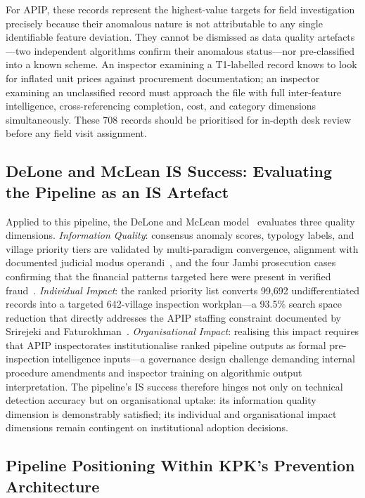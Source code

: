 \documentclass[3p,times,procedia]{elsarticle}
\begin{document}
For APIP, these records represent the highest-value targets for field investigation precisely because their anomalous nature is not attributable to any single identifiable feature deviation. They cannot be dismissed as data quality artefacts---two independent algorithms confirm their anomalous status---nor pre-classified into a known scheme. An inspector examining a T1-labelled record knows to look for inflated unit prices against procurement documentation; an inspector examining an unclassified record must approach the file with full inter-feature intelligence, cross-referencing completion, cost, and category dimensions simultaneously. These 708 records should be prioritised for in-depth desk review before any field visit assignment.

\subsection{DeLone and McLean IS Success: Evaluating the Pipeline as an IS Artefact}

Applied to this pipeline, the DeLone and McLean model~\cite{ref31} evaluates three quality dimensions. \textit{Information Quality}: consensus anomaly scores, typology labels, and village priority tiers are validated by multi-paradigm convergence, alignment with documented judicial modus operandi~\cite{ref13,ref14}, and the four Jambi prosecution cases confirming that the financial patterns targeted here were present in verified fraud~\cite{ref15,ref16,ref17,ref18}. \textit{Individual Impact}: the ranked priority list converts 99,692 undifferentiated records into a targeted 642-village inspection workplan---a 93.5\% search space reduction that directly addresses the APIP staffing constraint documented by Srirejeki and Faturokhman~\cite{ref29}. \textit{Organisational Impact}: realising this impact requires that APIP inspectorates institutionalise ranked pipeline outputs as formal pre-inspection intelligence inputs---a governance design challenge demanding internal procedure amendments and inspector training on algorithmic output interpretation. The pipeline's IS success therefore hinges not only on technical detection accuracy but on organisational uptake: its information quality dimension is demonstrably satisfied; its individual and organisational impact dimensions remain contingent on institutional adoption decisions.

\subsection{Pipeline Positioning Within KPK's Prevention Architecture}
\label{sec:pipeline_positioning}
\end{document}
